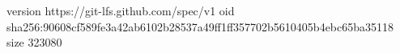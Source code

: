 version https://git-lfs.github.com/spec/v1
oid sha256:90608cf589fe3a42ab6102b28537a49ff1ff357702b5610405b4ebc65ba35118
size 323080
